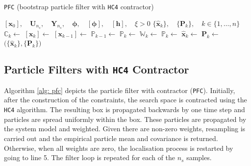 \begin{algorithm*}[t]
\caption[Particle filter with \texttt{HC4} contractor (\texttt{PFC})]{\texttt{PFC} (bootstrap particle filter with \texttt{HC4} contractor)}
\label{alg: pfc}
\begin{algorithmic}[1]
\Require $[\bm{x}_0], \quad \bm{U}_{n_s}, \quad \bm{Y}_{n_s}, \quad \bm{\phi}, \quad [\bm{\phi}], \quad [\bm{h}], \quad \xi > 0$ 
\Ensure $\big\{\hat{\bm{x}}_k\big\}, \quad \big\{\bm{P}_k\big\}, \quad k \in \{1, \dots, n\}$
\Statex
{}
\State $\mathbb{C}_k \gets$  
 
	\State $[\bm{x}_{k}] \gets$  \label{marker} 
	\State $[\bm{x}_{k-1}] \gets$  
    \State $\mathbb{P}_{k-1} \gets$  
 \EndIf
 \State $\mathbb{P}_{k} \gets$  
 \State $\mathbb{W}_{k} \gets$  
  
 \State {}
 \EndIf
 \State $\mathbb{P}_{k} \gets$  
 \State $\hat{\bm{x}}_k \gets$  
 \State $\bm{P}_k \gets$  
\EndFor
\State \Return $\Big(\big\{\hat{\bm{x}}_k\big\}, \big\{\bm{P}_k\big\}\Big)$ 
\EndFunction
\end{algorithmic}
\end{algorithm*}



\subsection{Particle Filters with \texttt{HC4} Contractor}

Algorithm \ref{alg: pfc} depicts the particle filter with contractor (\texttt{PFC}). Initially, after the construction of the constraints, the search space is contracted using the \texttt{HC4} algorithm. The resulting box is propagated backwards by one time step and particles are spread uniformly within the box. These particles are propagated by the system model and weighted. Given there are non-zero weights, resampling is carried out and the empirical particle mean and covariance is returned. Otherwise, when all weights are zero, the localisation process is restarted by going to line 5. The filter loop is repeated for each of the $n_s$ samples.

